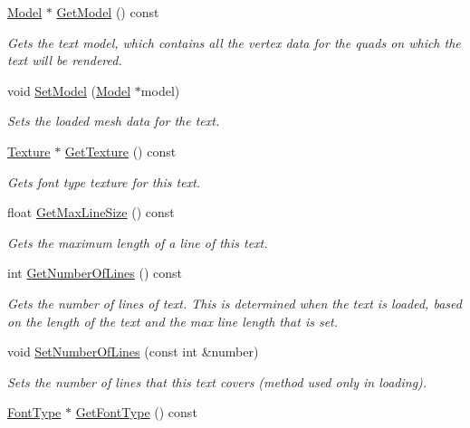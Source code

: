 \begin{DoxyCompactItemize}
\hyperlink{class_flounder_1_1_model}{Model} $\ast$ \hyperlink{class_flounder_1_1_text_a807a324dca3c047f7499c1b4049192c2}{Get\+Model} () const
\begin{DoxyCompactList}\small\item\em Gets the text model, which contains all the vertex data for the quads on which the text will be rendered. \end{DoxyCompactList}\item 
void \hyperlink{class_flounder_1_1_text_ab0603f5d9e2b6895a8ea6a16db3789fc}{Set\+Model} (\hyperlink{class_flounder_1_1_model}{Model} $\ast$model)
\begin{DoxyCompactList}\small\item\em Sets the loaded mesh data for the text. \end{DoxyCompactList}\item 
\hyperlink{class_flounder_1_1_texture}{Texture} $\ast$ \hyperlink{class_flounder_1_1_text_ae3841a5346a2f455fce161f0edb8b2d4}{Get\+Texture} () const
\begin{DoxyCompactList}\small\item\em Gets font type texture for this text. \end{DoxyCompactList}\item 
float \hyperlink{class_flounder_1_1_text_aafcc661625f84c790e27f5c8178f060f}{Get\+Max\+Line\+Size} () const
\begin{DoxyCompactList}\small\item\em Gets the maximum length of a line of this text. \end{DoxyCompactList}\item 
int \hyperlink{class_flounder_1_1_text_a76282907c0ace6f9d807a346c201d3fc}{Get\+Number\+Of\+Lines} () const
\begin{DoxyCompactList}\small\item\em Gets the number of lines of text. This is determined when the text is loaded, based on the length of the text and the max line length that is set. \end{DoxyCompactList}\item 
void \hyperlink{class_flounder_1_1_text_a04dad0122e7315f677cf9ad4c6b3ffa8}{Set\+Number\+Of\+Lines} (const int \&number)
\begin{DoxyCompactList}\small\item\em Sets the number of lines that this text covers (method used only in loading). \end{DoxyCompactList}\item 
\hyperlink{class_flounder_1_1_font_type}{Font\+Type} $\ast$ \hyperlink{class_flounder_1_1_text_ac12acd427fde7758f6bfd68c050d663d}{Get\+Font\+Type} () const

\end{DoxyCompactItemize}

